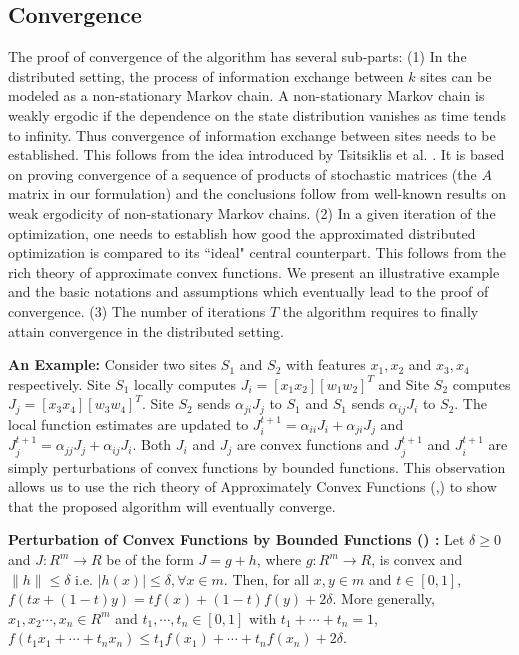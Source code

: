 \subsection{Convergence}
\label{sec:algterm}
The proof of convergence of the algorithm has several sub-parts: (1) In the distributed setting, the process of information exchange between $k$ sites can be modeled as a non-stationary Markov chain. A non-stationary Markov chain is weakly ergodic if the dependence on the state distribution vanishes as time tends to infinity. Thus convergence of information exchange between sites needs to be established. This follows from the idea introduced by Tsitsiklis et al. \cite{Tsitsiklis_86}. It is based on proving convergence of a sequence of products of stochastic matrices (the $A$ matrix in our formulation) and the conclusions follow from well-known results on weak ergodicity of non-stationary Markov chains. (2) In a given iteration of the optimization, one needs to establish how good the approximated distributed optimization is compared to its ``ideal" central counterpart. This follows from the rich theory of approximate convex functions. 
We present an illustrative example and the basic notations and assumptions which eventually lead to the proof of convergence. (3) The number of iterations $T$ the algorithm requires to finally attain convergence in the distributed setting.

\noindent \textbf{An Example: } Consider two sites $S_1$ and $S_2$ with features $x_1, x_2$ and $x_3, x_4$ respectively. Site $S_1$ locally computes $J_{i}=[x_1 x_2][w_1 w_2]^T$ and Site $S_2$ computes $J_{j}=[x_3 x_4][w_3 w_4]^T$. Site $S_2$ sends $\alpha_{ji}J_{j}$ to $S_1$ and $S_1$ sends $\alpha_{ij}J_i$ to $S_2$. The local function estimates are updated to $J_i^{t+1}=\alpha_{ii}J_i + \alpha_{ji}J_{j}$ and $J_j^{t+1}=\alpha_{jj}J_j + \alpha_{ij}J_i$. Both $J_i$ and $J_j$ are convex functions \cite{Boyd_04} and $J_j^{t+1}$ and $J_i^{t+1}$ are simply perturbations of convex functions by bounded functions. This observation allows us to use the rich theory of Approximately Convex Functions (\cite{Hyers_52},\cite{Pales_02}) to show that the proposed algorithm will eventually converge.

\begin{defn}
\label{defn:1}
\textbf{Perturbation of Convex Functions by Bounded Functions (\cite{Pales_02}) : }Let $\delta \ge 0$ and $J: R^m \rightarrow R$ be of the form $J = g+h$, where $g:R^m \rightarrow R$, is convex and $\parallel h \parallel \le \delta$ i.e. $|h(x)| \le \delta, \forall x \in m$. Then, for all $x, y \in m$ and $t \in [0,1]$, 
$ f(tx + (1-t)y) = t f(x) + (1-t)f(y) + 2 \delta.$ More generally, $x_1, x_2 \cdots, x_n \in R^m$ and $t_1, \cdots ,t_n \in [0,1]$ with $t_1+ \cdots + t_n =1$, $f(t_1 x_1+ \cdots + t_n x_n) \le t_1 f(x_1) + \cdots + t_n f(x_n) + 2 \delta.$
\end{defn}

